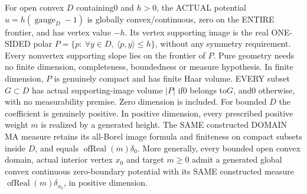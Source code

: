 \begin{lemma}
  \label{lem:gauge-cone-atomic}
  \leanok
  For open convex $D$ containing0 and $h>0$, the ACTUAL potential
  $u=h(\operatorname{gauge}_D-1)$ is globally convex/continuous,
  zero on the ENTIRE frontier, and has vertex value $-h$.
  Its vertex supporting image is the real ONE-SIDED polar
  $P=\{p:\ \forall y\in D,\ \langle p,y\rangle\le h\}$,
  without any symmetry requirement. Every nonvertex supporting slope lies
  on the frontier of $P$. Pure geometry needs no finite dimension,
  completeness, boundedness or measure hypothesis. In finite dimension,
  $P$ is genuinely compact and has finite Haar volume. EVERY subset
  $G\subset D$ has actual supporting-image volume $|P|$ if0 belongs to$G$,
  and0 otherwise, with no measurability premise. Zero dimension is included. For bounded $D$ the coefficient is genuinely positive. In positive dimension, every prescribed positive weight $m$ is realized by a generated height. The SAME constructed DOMAIN MA measure retains its all-Borel image formula and finiteness on compact subsets inside $D$, and equals $\operatorname{ofReal}(m)\delta_0$. More generally, every bounded open convex domain, actual interior vertex $x_0$ and target $m\ge0$ admit a generated global convex continuous zero-boundary potential with its SAME constructed measure $\operatorname{ofReal}(m)\delta_{x_0}$, in positive dimension.
\end{lemma}
